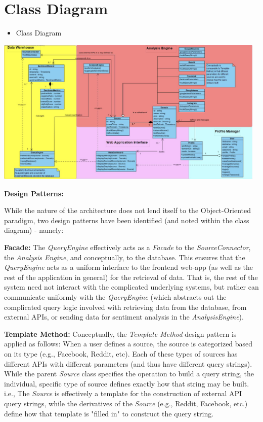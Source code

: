 \documentclass[12pt]{article}
\begin{document}
\section{Class Diagram}
\begin{itemize}
  \item Class Diagram
\end{itemize}
\begin{center}
  \includegraphics[width=13cm]{../../Images/pic2.png}
  \begin{flushleft}
    \textbf{Design Patterns:}
    \end{flushleft}
    
    While the nature of the architecture does not lend itself to the Object-Oriented paradigm, two design patterns have been identified (and noted within the class diagram) - namely:
    
    \textbf{Facade:} The \textit{QueryEngine} effectively acts as a \textit{Facade} to the \textit{SourceConnector}, the \textit{Analysis Engine}, and conceptually, to the database. This ensures that the \textit{QueryEngine} acts as a uniform interface to the frontend web-app (as well as the rest of the application in general) for the retrieval of data. That is, the rest of the system need not interact with the complicated underlying systems, but rather can communicate uniformly with the \textit{QueryEngine} (which abstracts out the complicated query logic involved with retrieving data from the database, from external APIs, or sending data for sentiment analysis in the \textit{AnalysisEngine}).
    
    \textbf{Template Method:} Conceptually, the \textit{Template Method} design pattern is applied as follows: When a user defines a source, the source is categorized based on its type (e.g., Facebook, Reddit, etc). Each of these types of sources has different APIs with different parameters (and thus have different query strings). While the parent \textit{Source} class specifies the operation to build a query string, the individual, specific type of source defines exactly how that string may be built. i.e., The \textit{Source} is effectively a template for the construction of external API query strings, while the derivatives of the \textit{Source} (e.g., Reddit, Facebook, etc.) define how that template is "filled in" to construct the query string.

\end{center}
\end{document}
